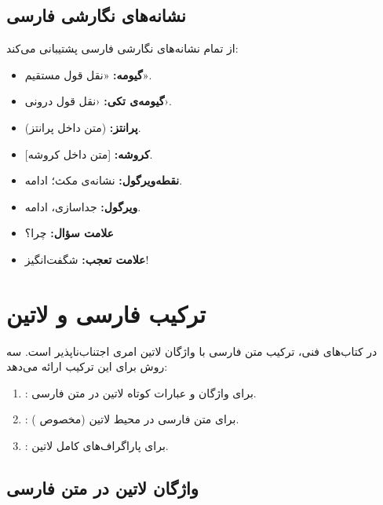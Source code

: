 
\subsection{نشانه‌های نگارشی فارسی}
\label{sec:text-persian-punctuation}

 از تمام نشانه‌های نگارشی فارسی
پشتیبانی می‌کند:

\begin{itemize}
    \item \textbf{گیومه:} «نقل قول مستقیم».
    \item \textbf{گیومه‌ی تکی:} ‹نقل قول درونی›.
    \item \textbf{پرانتز:} (متن داخل پرانتز).
    \item \textbf{کروشه:} [متن داخل کروشه].
    \item \textbf{نقطه‌ویرگول:} نشانه‌ی مکث؛ ادامه.
    \item \textbf{ویرگول:} جداسازی، ادامه.
    \item \textbf{علامت سؤال:} چرا؟
    \item \textbf{علامت تعجب:} شگفت‌انگیز!
\end{itemize}


\section{ترکیب فارسی و لاتین}
\label{sec:text-latin}

در کتاب‌های فنی، ترکیب متن فارسی با واژگان
لاتین امری اجتناب‌ناپذیر است. 
سه روش برای این ترکیب ارائه می‌دهد:

\begin{enumerate}
    \item {}: برای واژگان و
    عبارات کوتاه لاتین در متن فارسی.
    \item {}: برای متن فارسی در
    محیط لاتین (مخصوص ).
    \item {}: برای پاراگراف‌های
    کامل لاتین.
\end{enumerate}

\subsection{واژگان لاتین در متن فارسی}
\label{sec:text-latin-inline}

